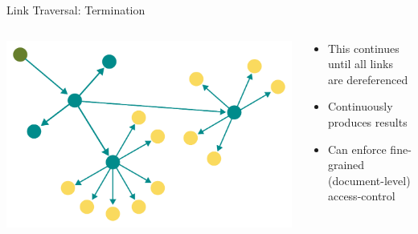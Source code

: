 \begin{frame}{Link Traversal: Termination}
    \begin{columns}[T] %
        \begin{column}{0.6\textwidth} %
            \includegraphics[width=\linewidth]{images/showing-link-traversal-step-3.pdf} %
        \end{column}

        \begin{column}{0.4\textwidth} %
            \begin{itemize}
                \item This continues until all links are dereferenced
                \item Continuously produces results
                \item Can enforce fine-grained (document-level) access-control

            \end{itemize}
        \end{column}
    \end{columns}
\end{frame}